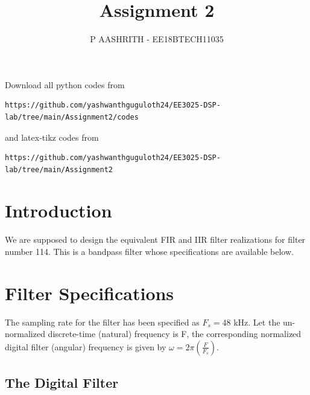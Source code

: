 \documentclass[journal,12pt,twocolumn]{IEEEtran}
\begin{document}
\def\putbox#1#2#3{\makebox[0in][l]{\makebox[#1][l]{}\raisebox{\baselineskip}[0in][0in]{\raisebox{#2}[0in][0in]{#3}}}}
     \def\rightbox#1{\makebox[0in][r]{#1}}
     \def\centbox#1{\makebox[0in]{#1}}
     \def\topbox#1{\raisebox{-\baselineskip}[0in][0in]{#1}}
     \def\midbox#1{\raisebox{-0.5\baselineskip}[0in][0in]{#1}}
\vspace{3cm}
\title{Assignment 2}
\author{P AASHRITH - EE18BTECH11035}
\maketitle
\newpage
\bigskip
\renewcommand{\thefigure}{\theenumi}
\renewcommand{\thetable}{\theenumi}
Download all python codes from 
\begin{lstlisting}
https://github.com/yashwanthguguloth24/EE3025-DSP-lab/tree/main/Assignment2/codes
\end{lstlisting}
%
and latex-tikz codes from 
%
\begin{lstlisting}
https://github.com/yashwanthguguloth24/EE3025-DSP-lab/tree/main/Assignment2
\end{lstlisting}
\section{Introduction}
We are supposed to design the equivalent FIR and IIR filter realizations for filter number 114.  
This is a bandpass filter whose specifications are available below.
\section{Filter Specifications}
The sampling rate for the filter has been specified as $F_s =  48$ kHz. Let the un-normalized  discrete-time (natural) frequency is F, the corresponding normalized digital filter (angular) frequency is given by $\omega = 2\pi
\left(\frac{F}{F_s}\right)$.

\subsection{The Digital Filter}
\end{document}
